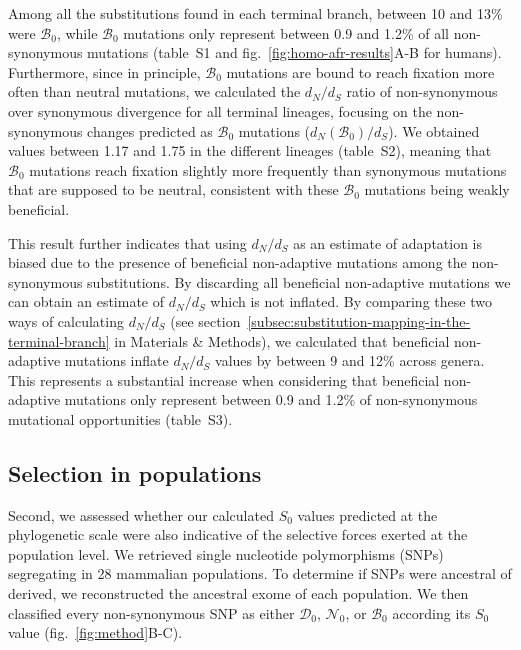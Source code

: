 \documentclass{article}
\newcommand{\dn}{d_N}
\newcommand{\ds}{d_S}
\newcommand{\dnds}{\dn / \ds}
\newcommand{\Sphy}{S_{0}}
\newcommand{\SphyDel}{\mathcal{D}_0}
\newcommand{\SphyNeu}{\mathcal{N}_0}
\newcommand{\SphyBen}{\mathcal{B}_0}
\begin{document}
    Among all the substitutions found in each terminal branch, between 10 and 13\% were $\SphyBen$, while $\SphyBen$ mutations only represent between 0.9 and 1.2\% of all non-synonymous mutations (table~S1 and fig.~\ref{fig:homo-afr-results}A-B for humans).
    Furthermore, since in principle, $\SphyBen$ mutations are bound to reach fixation more often than neutral mutations, we calculated the $\dnds$ ratio of non-synonymous over synonymous divergence for all terminal lineages, focusing on the non-synonymous changes predicted as $\SphyBen$ mutations ($\dn(\SphyBen) / \ds$).
    We obtained values between 1.17 and 1.75 in the different lineages (table~S2), meaning that $\SphyBen$ mutations reach fixation slightly more frequently than synonymous mutations that are supposed to be neutral, consistent with these $\SphyBen$ mutations being weakly beneficial.

    This result further indicates that using $\dnds$ as an estimate of adaptation is biased due to the presence of beneficial non-adaptive mutations among the non-synonymous substitutions.
    By discarding all beneficial non-adaptive mutations we can obtain an estimate of $\dnds$ which is not inflated.
    By comparing these two ways of calculating $\dnds$ (see section~\ref{subsec:substitution-mapping-in-the-terminal-branch} in Materials \& Methods), we calculated that beneficial non-adaptive mutations inflate $\dnds$ values by between 9 and 12\% across genera. This represents a substantial increase when considering that beneficial non-adaptive mutations only represent between 0.9 and 1.2\% of non-synonymous mutational opportunities (table~S3).

    \subsection*{Selection in populations}
    Second, we assessed whether our calculated $\Sphy$ values predicted at the phylogenetic scale were also indicative of the selective forces exerted at the population level.
    We retrieved single nucleotide polymorphisms (SNPs) segregating in 28 mammalian populations.
    To determine if SNPs were ancestral of derived, we reconstructed the ancestral exome of each population.
    We then classified every non-synonymous SNP as either $\SphyDel$, $\SphyNeu$, or $\SphyBen$ according its $\Sphy$ value (fig.~\ref{fig:method}B-C).
\end{document}
